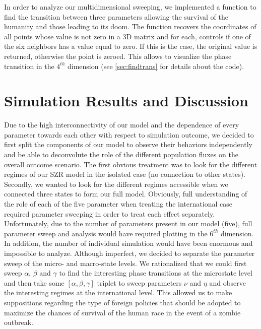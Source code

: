 \documentclass[11pt]{article} %
\begin{document}
In order to analyze our multidimensional sweeping, we implemented a function to find the transition between three parameters allowing the survival of the humanity and those leading to its doom. The function recovers the coordinates of all points whose value is not zero in a 3D matrix and for each, controls if one of the six neighbors has a value equal to zero. If this is the case, the original value is returned, otherwise the point is zeroed. This allows to visualize the phase transition in the $4^{th}$ dimension (see \ref{sec:findtrans} for details about the code).





\newpage
\section{Simulation Results and Discussion}\indent

Due to the high interconnectivity of our model and the dependence of every parameter towards each other with respect to simulation outcome, we decided to first split the components of our model to observe their behaviors independently and be able to deconvolute the role of the different population fluxes on the overall outcome scenario. The first obvious treatment was to look for the different regimes of our SZR model in the isolated case (no connection to other states). Secondly, we wanted to look for the different regimes accessible when we connected three states to form our full model. Obviously, full understanding of the role of each of the five parameter when treating the international case required parameter sweeping in order to treat each effect separately. Unfortunately, due to the number of parameters present in our model (five), full parameter sweep and analysis would have required plotting in the $6^{th}$ dimension. In addition, the number of individual simulation would have been enormous and impossible to analyze. Although imperfect, we decided to separate the parameter sweep of the micro- and macro-state levels. We rationalized that we could first sweep $\alpha$, $\beta$ and $\gamma$  to find the interesting phase transitions at the microstate level and then take some $[\alpha, \beta, \gamma]$ triplet to sweep parameters $\nu$ and $\eta$ and observe the interesting regimes at the international level. This allowed us to make suppositions regarding the type of foreign policies that should be adopted to maximize the chances of survival of the human race in the event of a zombie outbreak. 
\end{document}
